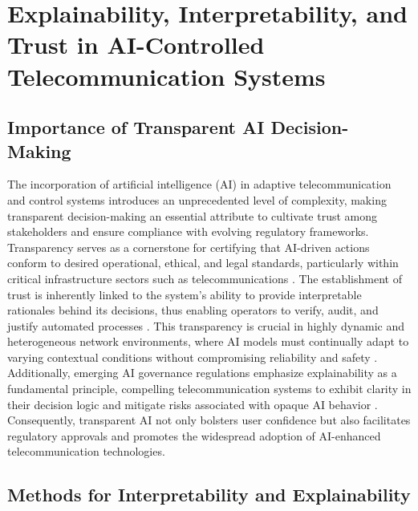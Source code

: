 \documentclass[sigconf]{acmart}
\begin{document}
\section{Explainability, Interpretability, and Trust in AI-Controlled Telecommunication Systems}

\subsection{Importance of Transparent AI Decision-Making}

The incorporation of artificial intelligence (AI) in adaptive telecommunication and control systems introduces an unprecedented level of complexity, making transparent decision-making an essential attribute to cultivate trust among stakeholders and ensure compliance with evolving regulatory frameworks. Transparency serves as a cornerstone for certifying that AI-driven actions conform to desired operational, ethical, and legal standards, particularly within critical infrastructure sectors such as telecommunications \cite{ref7,ref13}. The establishment of trust is inherently linked to the system’s ability to provide interpretable rationales behind its decisions, thus enabling operators to verify, audit, and justify automated processes \cite{ref15}. This transparency is crucial in highly dynamic and heterogeneous network environments, where AI models must continually adapt to varying contextual conditions without compromising reliability and safety \cite{ref48}. Additionally, emerging AI governance regulations emphasize explainability as a fundamental principle, compelling telecommunication systems to exhibit clarity in their decision logic and mitigate risks associated with opaque AI behavior \cite{ref50}. Consequently, transparent AI not only bolsters user confidence but also facilitates regulatory approvals and promotes the widespread adoption of AI-enhanced telecommunication technologies.

\subsection{Methods for Interpretability and Explainability}
\end{document}
